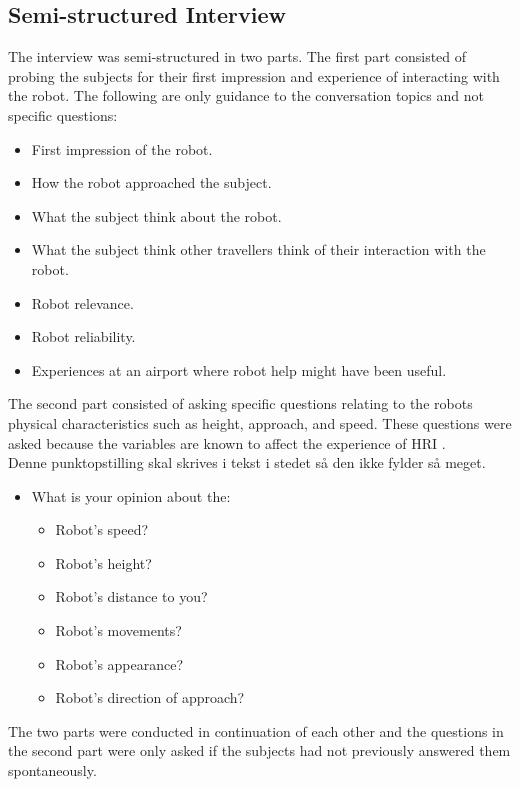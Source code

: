\subsection{Semi-structured Interview}
The interview was semi-structured in two parts. The first part consisted of probing the subjects for their first impression and experience of interacting with the robot. The following are only guidance to the conversation topics and not specific questions:\\ 
%
\begin{itemize}
\item First impression of the robot.
\item How the robot approached the subject.
\item What the subject think about the robot.
\item What the subject think other travellers think of their interaction with the robot.
\item Robot relevance.
\item Robot reliability.
\item Experiences at an airport where robot help might have been useful.\\
\end{itemize}
\noindent
%
The second part consisted of asking specific questions relating to the robots physical characteristics such as height, approach, and speed. These questions were asked because the variables are known to affect the experience of HRI \cite{PDF:HowMayIServeYou}.\\
%
{\color{red} Denne punktopstilling skal skrives i tekst i stedet så den ikke fylder så meget.}
\begin{itemize}
\item What is your opinion about the:
	\begin{itemize}
		\item Robot's speed?
		\item Robot's height?
		\item Robot's distance to you?
		\item Robot's movements?
		\item Robot's appearance?
		\item Robot's direction of approach? \\
	\end{itemize}
\end{itemize}
%
The two parts were conducted in continuation of each other and the questions in the second part were only asked if the subjects had not previously answered them spontaneously.
 

